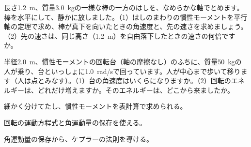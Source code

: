 \bkproblem 長さ\qty{1.2}{m}、質量\qty{3.0}{kg}の一様な棒の一方のはしを、なめらかな軸でとめます。棒を水平にして、静かに放しました。（1）はしのまわりの慣性モーメントを平行軸の定理で求め、棒が真下を向いたときの角速度と、先の速さを求めましょう。（2）先の速さは、同じ高さ（\qty{1.2}{m}）を自由落下したときの速さの何倍ですか。

\bkproblem 半径\qty{2.0}{m}、慣性モーメントの回転台（軸の摩擦なし）のふちに、質量\qty{50}{kg}の人が乗り、台といっしょに\qty{1.0}{rad/s}で回っています。人が中心まで歩いて移ります（人は点とみなす）。（1）台の角速度はいくらになりますか。（2）回転のエネルギーは、どれだけ増えますか。そのエネルギーは、どこから来ましたか。

\begin{furikaeri}
\begin{checklist}
\item 細かく分けてたし、慣性モーメントを表計算で求められる。
\item 回転の運動方程式と角運動量の保存を使える。
\item 角運動量の保存から、ケプラーの法則を導ける。
\end{checklist}
\end{furikaeri}
